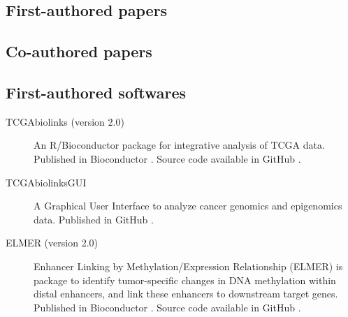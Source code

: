 \subsection{First-authored papers}

\subsection{Co-authored papers}



\subsection{First-authored softwares}
\begin{description}
	\item[TCGAbiolinks (version 2.0)] An R/Bioconductor package for integrative analysis of TCGA data. Published in Bioconductor . Source code available in GitHub .
    \item[TCGAbiolinksGUI] A Graphical User Interface to analyze cancer genomics and epigenomics data. Published in GitHub .
    \item[ELMER (version 2.0)] Enhancer Linking by Methylation/Expression Relationship (ELMER) is package to identify tumor-specific changes in DNA methylation within distal enhancers, and link these enhancers to downstream target genes. Published in Bioconductor . Source code available in GitHub  .
\end{description}

